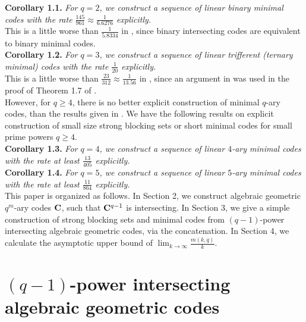 \documentclass[12pt]{article}
\begin{document}
{\bf Corollary 1.1.} {\em For $q=2$, we construct a sequence of linear binary minimal codes with the rate $\frac{145}{961} \approx \frac{1}{6.6276}$ explicitly.}\\

This is a little worse than $\frac{1}{5.8334}$ in \cite[Table 3]{Borello}, since binary intersecting codes are equivalent to binary minimal codes.\\



{\bf Corollary 1.2.} {\em For $q=3$, we construct a sequence of linear trifferent (ternary minimal) codes with the rate $\frac{1}{20}$ explicitly.}\\

This is a little worse than $\frac{23}{312}\approx \frac{1}{13.56}$ in \cite[Theorem 1.7]{Bishnoi}, since an argument in \cite{Alon1} was used in the proof of Theorem 1.7 of \cite{Bishnoi}.\\

However, for $q \geq 4$, there is no better explicit construction of minimal $q$-ary codes, than the results given in \cite[Table 3]{Alon}. We have the following results on explicit construction of small size strong blocking sets or short minimal codes for small prime powers $q \geq 4$.\\

{\bf Corollary 1.3.} {\em For $q=4$, we construct a sequence of linear $4$-ary minimal codes with the rate at least $\frac{13}{405}$ explicitly.}\\

{\bf Corollary 1.4.} {\em For $q=5$, we construct a sequence of linear $5$-ary minimal codes with the rate at least $\frac{11}{864}$ explicitly.}\\



This paper is organized as follows. In Section 2, we construct algebraic geometric $q^m$-ary codes ${\bf C}$, such that ${\bf C}^{q-1}$ is intersecting.  In Section 3, we give a simple construction of strong blocking sets and minimal codes from $(q-1)$-power intersecting algebraic geometric codes, via the concatenation. In Section 4, we calculate the asymptotic upper bound of $\lim_{k \longrightarrow \infty}\frac{m(k,q)}{k}$. \\

\section{$(q-1)$-power intersecting algebraic geometric codes}
\end{document}
